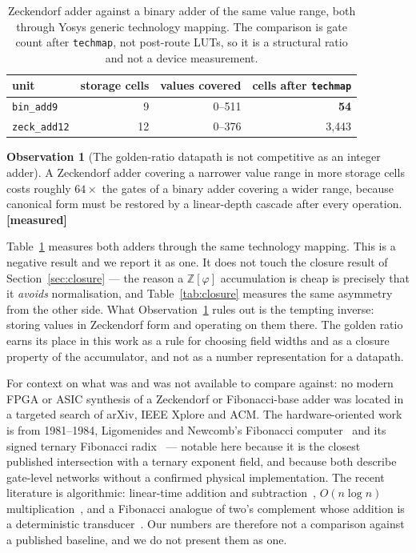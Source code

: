 \documentclass[11pt]{article}
\theoremstyle{definition}
\newtheorem{observation}[theorem]{Observation}
\begin{document}
\begin{table}[t]\centering
\caption{Zeckendorf adder against a binary adder of the same value range, both
through Yosys generic technology mapping. The comparison is gate count after
\texttt{techmap}, not post-route LUTs, so it is a structural ratio and not a
device measurement.}
\label{tab:zeckcost}
\begin{tabular}{lrrr}
\toprule
unit & storage cells & values covered & cells after \texttt{techmap} \\
\midrule
\texttt{bin\_add9}   & 9  & 0--511 & \textbf{54} \\
\texttt{zeck\_add12} & 12 & 0--376 & 3{,}443 \\
\bottomrule
\end{tabular}
\end{table}

\begin{observation}[The golden-ratio datapath is not competitive as an integer adder]
\label{obs:zeckcost}
A Zeckendorf adder covering a narrower value range in more storage cells costs
roughly $64\times$ the gates of a binary adder covering a wider range, because
canonical form must be restored by a linear-depth cascade after every operation.
\textbf{[measured]}
\end{observation}

Table~\ref{tab:zeckcost} measures both adders through the same technology
mapping. This is a negative result and we report it as one. It does not touch the closure
result of Section~\ref{sec:closure} --- the reason a $\mathbb{Z}[\varphi]$
accumulation is cheap is precisely that it \emph{avoids} normalisation, and
Table~\ref{tab:closure} measures the same asymmetry from the other side. What
Observation~\ref{obs:zeckcost} rules out is the tempting inverse: storing values
in Zeckendorf form and operating on them there. The golden ratio earns its place
in this work as a rule for choosing field widths and as a closure property of the
accumulator, and not as a number representation for a datapath.

For context on what was and was not available to compare against: no modern
FPGA or ASIC synthesis of a Zeckendorf or Fibonacci-base adder was located in a
targeted search of arXiv, IEEE Xplore and ACM. The hardware-oriented work is from
1981--1984, Ligomenides and Newcomb's Fibonacci
computer~\cite{ligomenides1981complement} and its signed ternary Fibonacci
radix~\cite{ligomenides1984multilevel} --- notable here because it is the
closest published intersection with a ternary exponent field, and because both
describe gate-level networks without a confirmed physical implementation. The
recent literature is algorithmic: linear-time addition and
subtraction~\cite{ahlbach2012efficient}, $O(n\log n)$
multiplication~\cite{idziaszek2021efficient}, and a Fibonacci analogue of
two's complement whose addition is a deterministic
transducer~\cite{labbe2022fibonacci}. Our numbers are therefore not a comparison
against a published baseline, and we do not present them as one.
\end{document}
